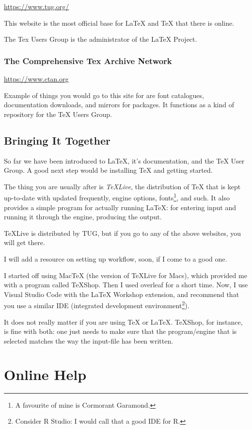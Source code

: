 \documentclass[11pt, oneside]{memoir}
\begin{document}
\url{https://www.tug.org/}

This website is the most official base for LaTeX and TeX that there is online. 

The Tex Users Group is the administrator of the LaTeX Project.

\subsection{The Comprehensive Tex Archive Network}
\url{https://www.ctan.org}

Example of things you would go to this site for are font catalogues, documentation downloads, and mirrors for packages. It functions as a kind of repository for the TeX Users Group.

\section{Bringing It Together}

So far we have been introduced to LaTeX, it's documentation, and the TeX User Group. A good next step would be installing TeX and getting started.

The thing you are usually after is \emph{TeXLive}, the distribution of TeX that is kept up-to-date with updated frequently, engine options, fonts\footnote{A favourite of mine is Cormorant Garamond.}, and such. It also provides a simple program for actually running LaTeX: for entering input and running it through the engine, producing the output.

TeXLive is distributed by TUG, but if you go to any of the above websites, you will get there.

I will add a resource on setting up workflow, soon, if I come to a good one.

I started off using MacTeX (the version of TeXLive for Macs), which provided me with a program called TeXShop. Then I used overleaf for a short time. Now, I use Visual Studio Code with the LaTeX Workshop extension, and recommend that you use a similar IDE (integrated development environment\footnote{Consider R Studio: I would call that a good IDE for R.}).

It does not really matter if you are using TeX or LaTeX. TeXShop, for instance, is fine with both: one just needs to make sure that the program/engine that is selected matches the way the input-file has been written.

\chapter{Online Help}
\end{document}
